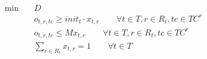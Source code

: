\begin{align}
  \min\quad & D \tag{eq\_0008} \\
  & o_{t,r,tc} \geq \mathit{init}_{t} \cdot x_{t,r} \qquad \forall t \in T, r \in R_{t}, tc \in \mathit{TC}^{r} \tag{eq\_0010} \\
  & o_{t,r,tc} \le Mx_{t,r} \qquad \forall t \in T, r \in R_{t}, tc \in TC^{r} \tag{eq\_0011} \\
  & \sum_{r \in R_{t}} x_{t,r} = 1 \qquad \forall t \in T \tag{eq\_0013} \\
\end{align}
